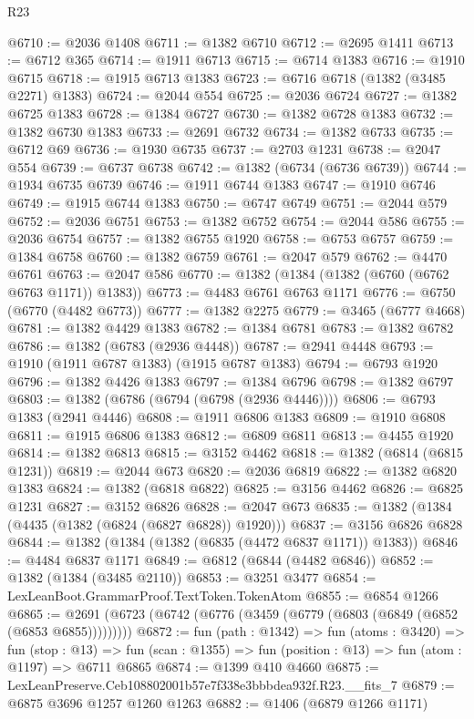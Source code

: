 \begin{lexlean}{R23}
\begin{coremodule}
@6710 := @2036 @1408
@6711 := @1382 @6710
@6712 := @2695 @1411
@6713 := @6712 @365
@6714 := @1911 @6713
@6715 := @6714 @1383
@6716 := @1910 @6715
@6718 := @1915 @6713 @1383
@6723 := @6716 @6718 (@1382 (@3485 @2271) @1383)
@6724 := @2044 @554
@6725 := @2036 @6724
@6727 := @1382 @6725 @1383
@6728 := @1384 @6727
@6730 := @1382 @6728 @1383
@6732 := @1382 @6730 @1383
@6733 := @2691 @6732
@6734 := @1382 @6733
@6735 := @6712 @69
@6736 := @1930 @6735
@6737 := @2703 @1231
@6738 := @2047 @554
@6739 := @6737 @6738
@6742 := @1382 (@6734 (@6736 @6739))
@6744 := @1934 @6735 @6739
@6746 := @1911 @6744 @1383
@6747 := @1910 @6746
@6749 := @1915 @6744 @1383
@6750 := @6747 @6749
@6751 := @2044 @579
@6752 := @2036 @6751
@6753 := @1382 @6752
@6754 := @2044 @586
@6755 := @2036 @6754
@6757 := @1382 @6755 @1920
@6758 := @6753 @6757
@6759 := @1384 @6758
@6760 := @1382 @6759
@6761 := @2047 @579
@6762 := @4470 @6761
@6763 := @2047 @586
@6770 := @1382 (@1384 (@1382 (@6760 (@6762 @6763 @1171)) @1383))
@6773 := @4483 @6761 @6763 @1171
@6776 := @6750 (@6770 (@4482 @6773))
@6777 := @1382 @2275
@6779 := @3465 (@6777 @4668)
@6781 := @1382 @4429 @1383
@6782 := @1384 @6781
@6783 := @1382 @6782
@6786 := @1382 (@6783 (@2936 @4448))
@6787 := @2941 @4448
@6793 := @1910 (@1911 @6787 @1383) (@1915 @6787 @1383)
@6794 := @6793 @1920
@6796 := @1382 @4426 @1383
@6797 := @1384 @6796
@6798 := @1382 @6797
@6803 := @1382 (@6786 (@6794 (@6798 (@2936 @4446))))
@6806 := @6793 @1383 (@2941 @4446)
@6808 := @1911 @6806 @1383
@6809 := @1910 @6808
@6811 := @1915 @6806 @1383
@6812 := @6809 @6811
@6813 := @4455 @1920
@6814 := @1382 @6813
@6815 := @3152 @4462
@6818 := @1382 (@6814 (@6815 @1231))
@6819 := @2044 @673
@6820 := @2036 @6819
@6822 := @1382 @6820 @1383
@6824 := @1382 (@6818 @6822)
@6825 := @3156 @4462
@6826 := @6825 @1231
@6827 := @3152 @6826
@6828 := @2047 @673
@6835 := @1382 (@1384 (@4435 (@1382 (@6824 (@6827 @6828)) @1920)))
@6837 := @3156 @6826 @6828
@6844 := @1382 (@1384 (@1382 (@6835 (@4472 @6837 @1171)) @1383))
@6846 := @4484 @6837 @1171
@6849 := @6812 (@6844 (@4482 @6846))
@6852 := @1382 (@1384 (@3485 @2110))
@6853 := @3251 @3477
@6854 := LexLeanBoot.GrammarProof.TextToken.TokenAtom
@6855 := @6854 @1266
@6865 := @2691 (@6723 (@6742 (@6776 (@3459 (@6779 (@6803 (@6849 (@6852 (@6853 @6855)))))))))
@6872 := fun (path : @1342) =>
  fun (atoms : @3420) =>
  fun (stop : @13) =>
  fun (scan : @1355) => fun (position : @13) => fun (atom : @1197) => @6711 @6865
@6874 := @1399 @410 @4660
@6875 := LexLeanPreserve.Ceb108802001b57e7f338e3bbbdea932f.R23.__fits_7
@6879 := @6875 @3696 @1257 @1260 @1263
@6882 := @1406 (@6879 @1266 @1171)

\end{coremodule}
\end{lexlean}
